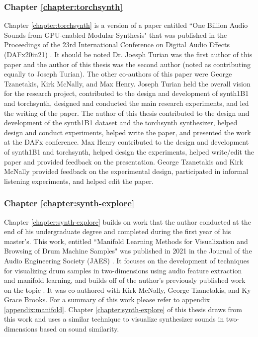 \subsubsection{Chapter \ref{chapter:torchsynth}}
Chapter \ref{chapter:torchsynth} is a version of a paper entitled ``One Billion Audio Sounds from GPU-enabled Modular Synthesis" that was published in the Proceedings of the 23rd International Conference on Digital Audio Effects (DAFx20in21) \cite{turian2021one}. It should be noted Dr. Joesph Turian was the first author of this paper and the author of this thesis was the second author (noted as contributing equally to Joseph Turian). The other co-authors of this paper were George Tzanetakis, Kirk McNally, and Max Henry. Joseph Turian held the overall vision for the research project, contributed to the design and development of synth1B1 and torchsynth, designed and conducted the main research experiments, and led the writing of the paper. The author of this thesis contributed to the design and development of the synth1B1 dataset and the torchsynth synthesizer, helped design and conduct experiments, helped write the paper, and presented the work at the DAFx conference. Max Henry contributed to the design and development of synth1B1 and torchsynth, helped design the experiments, helped write/edit the paper and provided feedback on the presentation. George Tzanetakis and Kirk McNally provided feedback on the experimental design, participated in informal listening experiments, and helped edit the paper.

\subsubsection{Chapter \ref{chapter:synth-explore}}
Chapter \ref{chapter:synth-explore} builds on work that the author conducted at the end of his undergraduate degree and completed during the first year of his master's. This work, entitled ``Manifold Learning Methods for Visualization and Browsing of Drum Machine Samples" was published in 2021 in the Journal of the Audio Engineering Society (JAES) \cite{shier2021manifold}. It focuses on the development of techniques for visualizing drum samples in two-dimensions using audio feature extraction and manifold learning, and builds off of the author's previously published work on the topic \cite{shier2017analysis, shier2017sieve}. It was co-authored with Kirk McNally, George Tzanetakis, and Ky Grace Brooks. For a summary of this work please refer to appendix \ref{appendix:manifold}. Chapter \ref{chapter:synth-explore} of this thesis draws from this work and uses a similar technique to visualize synthesizer sounds in two-dimensions based on sound similarity.

